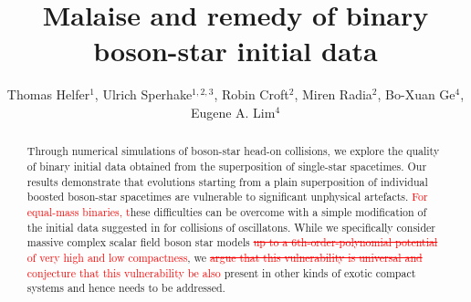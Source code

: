 \documentclass[]{iopart}
\newcommand{\new}[1]{\textcolor{red}{#1}}
\begin{document}

\pagestyle{fancy}
\chead{}
\rhead{\thepage}
\lfoot{}
\cfoot{}
\rfoot{}

\begin{center}
\title{\large Malaise and remedy of binary boson-star initial data}
\end{center}

\author{
Thomas Helfer$^{1}$,
Ulrich Sperhake$^{1,2,3}$,
Robin Croft$^{2}$,
Miren Radia$^{2}$,
Bo-Xuan Ge$^4$,
Eugene A. Lim$^4$
}

\address{$^{1}$~Department of Physics and Astronomy, Johns Hopkins University, 3400 N. Charles Street, Baltimore, Maryland 21218, USA}

\address{$^{2}$~Department of Applied Mathematics and Theoretical Physics,
Centre for Mathematical Sciences, University of Cambridge,
Wilberforce Road, Cambridge CB3 0WA, United Kingdom}

\address{$^{3}$~Theoretical Astrophysics 350-17,
California Institute of Technology,
1200 E California Boulevard, Pasadena, CA 91125, USA}

\address{$^{4}$~Theoretical Particle Physics and Cosmology Group, Physics Department,Kings College London, Strand, London WC2R 2LS, United Kingdom}





\begin{abstract}
Through numerical simulations of boson-star head-on collisions, we
explore the quality of binary initial data obtained from the
superposition of single-star spacetimes.  Our results demonstrate
that evolutions starting from a plain superposition of individual
boosted boson-star spacetimes are vulnerable to significant unphysical
artefacts.
\new{For equal-mass binaries, t}hese difficulties can be overcome with a simple
modification of the initial data suggested in \cite{Helfer:2018vtq}
for collisions of oscillatons.
While we specifically consider massive complex scalar field boson
star models \new{\sout{up to a 6th-order-polynomial potential}
of very high and low compactness}, we \new{\sout{argue that
this vulnerability is universal and}
conjecture that this vulnerability be also} present in other kinds of exotic
compact systems and hence needs to be addressed.
\end{abstract}
\end{document}
